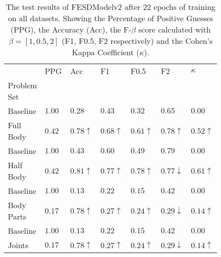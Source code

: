     \begin{table}[!htbp]
        \caption[Test Results of FESDModelv2]{The test results of FESDModelv2 after 22 epochs of training on all datasets. Showing the Percentage of Positive Guesses (PPG), the Accuracy (Acc), the F-$\beta$ score calculated with $\beta = [1, 0.5, 2]$ (F1, F0.5, F2 respectively) and the Cohen's Kappa Coefficient ($\kappa$).}
        \label{tab:hi_res_v2}
        \begin{tabular}{p{0.14\linewidth}p{0.12\linewidth}p{0.12\linewidth}p{0.12\linewidth}p{0.12\linewidth}p{0.12\linewidth}p{0.12\linewidth}}
\hline
{} &   PPG &  Acc &   F1 &  F0.5 &   F2 &  $\kappa$ \\
Problem Set   &       &      &      &       &      &           \\
\hline
\hline
Baseline    & $1.00$ &	$0.28$ &	        $0.43$ &	        $0.32$ &	        $0.65$ &	        $0.00$ \\
Full Body   & $0.42$ &	$0.78\uparrow$ &	$0.68\uparrow$ &	$0.61\uparrow$ &	$0.78\uparrow$ &	$0.52\uparrow$ \\
\hline
Baseline    & $1.00$ &	$0.43$ &	        $0.60$ &	        $0.49$ & 	        $0.79$ &	        $0.00$ \\
Half Body   & $0.42$ &	$0.81\uparrow$ &	$0.77\uparrow$ &	$0.78\uparrow$ &	$0.77\downarrow$ &	$0.61\uparrow$ \\
\hline
Baseline    & $1.00$ &	$0.13$ &	        $0.22$ &	        $0.15$ &	        $0.42$ &	        $0.00$ \\
Body Parts  & $0.17$ &	$0.78\uparrow$ &	$0.27\uparrow$ &	$0.24\uparrow$ &	$0.29\downarrow$ &	$0.14\uparrow$ \\
\hline
Baseline    & $1.00$ &	$0.13$ &	        $0.22$ &	        $0.15$ &	        $0.42$ &	        $0.00$ \\
Joints      & $0.17$ &	$0.78\uparrow$ &	$0.27\uparrow$ &	$0.24\uparrow$ &	$0.29\downarrow$ &	$0.14\uparrow$ \\
\hline
\end{tabular}

    \end{table}
  